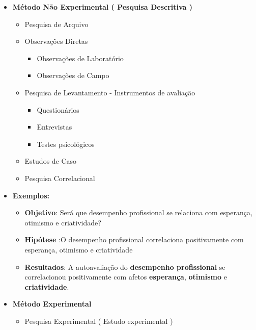 \documentclass[
]{book}
\providecommand{\tightlist}{%
  \setlength{\itemsep}{0pt}\setlength{\parskip}{0pt}}
\begin{document}
\begin{itemize}
\tightlist
\item
  \textbf{Método Não Experimental ( Pesquisa Descritiva )}

  \begin{itemize}
  \tightlist
  \item
    Pesquisa de Arquivo
  \item
    Observações Diretas

    \begin{itemize}
    \tightlist
    \item
      Observações de Laboratório
    \item
      Observações de Campo
    \end{itemize}
  \item
    Pesquisa de Levantamento - Instrumentos de avaliação

    \begin{itemize}
    \tightlist
    \item
      Questionários
    \item
      Entrevistas
    \item
      Testes psicológicos
    \end{itemize}
  \item
    Estudos de Caso
  \item
    Pesquisa Correlacional
  \end{itemize}
\item
  \textbf{Exemplos:}

  \begin{itemize}
  \tightlist
  \item
    \textbf{Objetivo}: Será que desempenho profissional se relaciona com esperança, otimismo e criatividade?
  \item
    \textbf{Hipótese} :O desempenho profissional correlaciona positivamente com esperança, otimismo e criatividade
  \item
    \textbf{Resultados}: A autoavaliação do \textbf{desempenho profissional} se correlacionou positivamente com afetos \textbf{esperança}, \textbf{otimismo} e \textbf{criatividade}.
  \end{itemize}
\item
  \textbf{Método Experimental}

  \begin{itemize}
  \tightlist
  \item
    Pesquisa Experimental ( Estudo experimental )
  \end{itemize}
\end{itemize}
\end{document}

